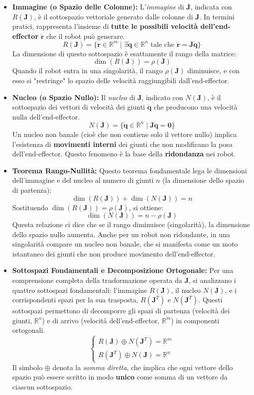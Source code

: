 ﻿\documentclass[11pt, a4paper]{article}
\begin{document}
\begin{itemize}
    \item \textbf{Immagine (o Spazio delle Colonne):} L'\textit{immagine} di \(\bm{J}\), indicata con $R(\bm{J})$, è il sottospazio vettoriale generato dalle colonne di \(\bm{J}\). In termini pratici, rappresenta l'insieme di \textbf{tutte le possibili velocità dell'end-effector} \(\bm{\dot{r}}\) che il robot può generare.
    \[
        R(\bm{J}) = \{\bm{\dot{r}} \in \mathbb{R}^{m} \mid \exists \dot{\bm{q}} \in \mathbb{R}^{n} \text{ tale che } \bm{\dot{r}} = \bm{J}\dot{\bm{q}}\}
    \]
    La dimensione di questo sottospazio è esattamente il rango della matrice:
    \[
        \dim(R(\bm{J})) = \rho(\bm{J})
    \]
    Quando il robot entra in una singolarità, il rango \(\rho(\bm{J})\) diminuisce, e con esso si "restringe" lo spazio delle velocità raggiungibili dall'end-effector.

    \item \textbf{Nucleo (o Spazio Nullo):} Il \textit{nucleo} di \(\bm{J}\), indicato con $N(\bm{J})$, è il sottospazio dei vettori di velocità dei giunti \(\dot{\bm{q}}\) che producono una velocità nulla dell'end-effector.
    \[
        N(\bm{J}) = \{\dot{\bm{q}} \in \mathbb{R}^{n} \mid \bm{J}\dot{\bm{q}} = \bm{0}\}
    \]
    Un nucleo non banale (cioè che non contiene solo il vettore nullo) implica l'esistenza di \textbf{movimenti interni} dei giunti che non modificano la posa dell'end-effector. Questo fenomeno è la base della \textbf{ridondanza} nei robot.
    \newpage
    \item \textbf{Teorema Rango-Nullità:} Questo teorema fondamentale lega le dimensioni dell'immagine e del nucleo al numero di giunti \(n\) (la dimensione dello spazio di partenza):
    \[
        \dim(R(\bm{J})) + \dim(N(\bm{J})) = n
    \]
    Sostituendo $\dim(R(\bm{J})) = \rho(\bm{J})$, si ottiene:
    \[
        \dim(N(\bm{J})) = n - \rho(\bm{J})
    \]
    Questa relazione ci dice che se il rango diminuisce (singolarità), la dimensione dello spazio nullo aumenta. Anche per un robot non ridondante, in una singolarità compare un nucleo non banale, che si manifesta come un moto istantaneo dei giunti che non produce movimento dell'end-effector.

    \item \textbf{Sottospazi Fondamentali e Decomposizione Ortogonale:} Per una comprensione completa della trasformazione operata da \(\bm{J}\), si analizzano i quattro sottospazi fondamentali: l'immagine \(R(\bm{J})\), il nucleo \(N(\bm{J})\), e i corrispondenti spazi per la sua trasposta, \(R(\bm{J}^T)\) e \(N(\bm{J}^T)\). Questi sottospazi permettono di decomporre gli spazi di partenza (velocità dei giunti, \(\mathbb{R}^n\)) e di arrivo (velocità dell'end-effector, \(\mathbb{R}^m\)) in componenti ortogonali.
    \[
    \begin{cases}
        R(\bm{J}) \oplus N(\bm{J}^T) = \mathbb{R}^{m} \\
        R(\bm{J}^T) \oplus N(\bm{J}) = \mathbb{R}^{n}
    \end{cases}
    \]
    Il simbolo \(\oplus\) denota la \textit{somma diretta}, che implica che ogni vettore dello spazio può essere scritto in modo \textbf{unico} come somma di un vettore da ciascun sottospazio.


\end{itemize}
\end{document}
